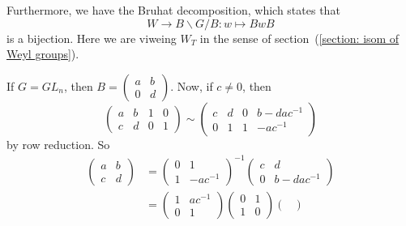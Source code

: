 \begin{itemize}
\begin{remark}
    \end{remark}
    Furthermore, we have the Bruhat decomposition, which states that 
    \begin{equation}\label{equation : Bruhat decomposition}
        W \rightarrow B\backslash G/B: w \mapsto BwB
    \end{equation}
    is a bijection. Here we are viweing $W_T$ in the sense of section~(\ref{section: isom of Weyl groups}).
    \begin{example}
        If $G=GL_n$, then $B=\begin{pmatrix}a&b\\0&d\end{pmatrix}$. Now, if $c\neq0$, then 
        \begin{equation}
          \begin{pmatrix}
            a&b&1&0\\c&d&0&1
          \end{pmatrix}\sim 
          \begin{pmatrix}
            c&d&0&b-dac^{-1}\\0&1&1&-ac^{-1}
          \end{pmatrix}
        \end{equation}
        by row reduction. So 
        \begin{equation}
            \begin{split}
                \begin{pmatrix}
                    a&b\\c&d
                \end{pmatrix} &=  \begin{pmatrix}
                    0&1\\1&-ac^{-1}
                \end{pmatrix}^{-1} \begin{pmatrix}
                    c&d\\0&b-dac^{-1}
                \end{pmatrix}\\
                &= \begin{pmatrix}
                    1&ac^{-1}\\0&1
                \end{pmatrix}
                 \begin{pmatrix}
                    0&1\\1&0
                \end{pmatrix}
                 \begin{pmatrix}

\end{pmatrix}
\end{split}
\end{equation}
\end{example}
\end{itemize}
